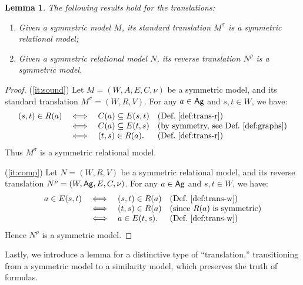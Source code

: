 \documentclass{article}
\newtheorem{lemma}[theorem]{Lemma}%
\newcommand{\ab}{\ensuremath{A}\xspace}
\newcommand{\ag}{\text{\normalfont\textsf{Ag}}\xspace}
\begin{document}
\begin{lemma}\label{lem:sem-trans}
The following results hold for the translations:
\begin{enumerate}
\item\label{it:sound} Given a symmetric model $M$, its standard translation $M^\sigma$ is a symmetric relational model;
\item\label{it:comp} Given a symmetric relational model $N$, its reverse translation $N^\rho$ is a symmetric model.
\end{enumerate}
\end{lemma}
\begin{proof}
(\ref{it:sound}) Let $M=(W,\ab,E,C,\nu)$ be a symmetric model,  and its standard translation $M^\sigma = (W, R, V)$. For any $a\in \ag$ and $s,t\in W$, we have:
\[
\begin{array}{llll}
	(s,t)\in R(a) & \iff & C(a)\subseteq E(s,t) & \text{(Def.~\ref{def:trans-r})}\\
	& \iff & C(a)\subseteq E(t,s) & \text{(by symmetry, see Def.~\ref{def:graphs})}\\
	& \iff & (t,s)\in R(a). & \text{(Def.~\ref{def:trans-r})}\\
\end{array}
\]
Thus $M^\sigma$ is a symmetric relational model.

(\ref{it:comp}) Let $N = (W,R,V)$ be a symmetric relational model, and its reverse translation $N^\rho = (W,\ag,E,C,\nu)$. For any $a \in \ag$ and $s,t\in W$, we have:
\[
\begin{array}{llll}
	a\in E(s,t) & \iff & (s,t)\in R(a) & \text{(Def.~\ref{def:trans-w})}\\
	& \iff & (t,s)\in R(a) & \text{(since $R(a)$ is symmetric)}\\
	& \iff & a\in E(t,s). & \text{(Def.~\ref{def:trans-w})}\\
\end{array}
\]
Hence $N^\rho$ is a symmetric model.
\end{proof}

Lastly, we introduce a lemma for a distinctive type of ``translation,'' transitioning from a symmetric model to a similarity model, which preserves the truth of formulas.
\end{document}

